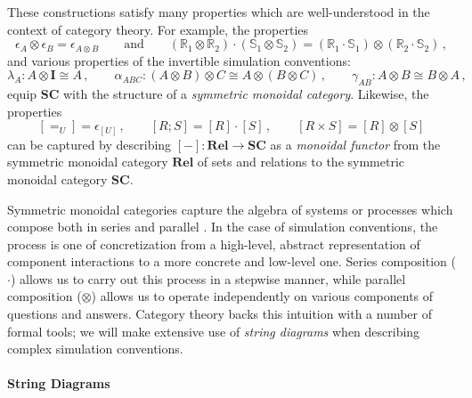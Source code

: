 \documentclass[acmsmall,screen,review,anonymous]{acmart}
\begin{document}
These constructions satisfy many properties
which are well-understood in the context of category theory.
For example, the properties
\[
  \epsilon_A \otimes \epsilon_B = \epsilon_{A \otimes B}
  \qquad \text{and}
  \qquad
  (\mathbb{R}_1 \otimes \mathbb{R}_2) \cdot
  (\mathbb{S}_1 \otimes \mathbb{S}_2) =
  (\mathbb{R}_1 \cdot \mathbb{S}_1) \otimes
  (\mathbb{R}_2 \cdot \mathbb{S}_2)
  \,,
\]
and various properties of the invertible simulation conventions:
\[
  \lambda_A : A \otimes \mathbf{I} \cong A \,,
  \qquad
  \alpha_{ABC} : (A \otimes B) \otimes C \cong A \otimes (B \otimes C) \,,
  \qquad
  \gamma_{AB} : A \otimes B \cong B \otimes A \,,
\]
equip %
$\mathbf{SC}$
with the structure of a \emph{symmetric monoidal category}.
Likewise, the properties
\[
  [{=}_U] = \epsilon_{[U]} \,,
  \qquad
  [R \mathbin; S] = [R] \cdot [S] \,,
  \qquad
  [R \times S] = [R] \otimes [S]
\]
can be captured by describing
$[-] : \mathbf{Rel} \rightarrow \mathbf{SC}$
as a \emph{monoidal functor}
from the symmetric monoidal category $\mathbf{Rel}$
of sets and relations
to the symmetric monoidal category $\mathbf{SC}$.

Symmetric monoidal categories capture
the algebra of systems or processes which
compose both in series and parallel
\cite{rosetta}.
In the case of simulation conventions,
the process is one of concretization
from a high-level, abstract representation
of component interactions
to a more concrete and low-level one.
Series composition ($\cdot$)
allows us to carry out this process in a stepwise manner,
while parallel composition ($\otimes$)
allows us to operate independently on various components
of questions and answers.
Category theory backs this intuition
with a number of formal tools;
we will make extensive use of \emph{string diagrams}
when describing complex simulation conventions.


\paragraph{String Diagrams} %
\end{document}
